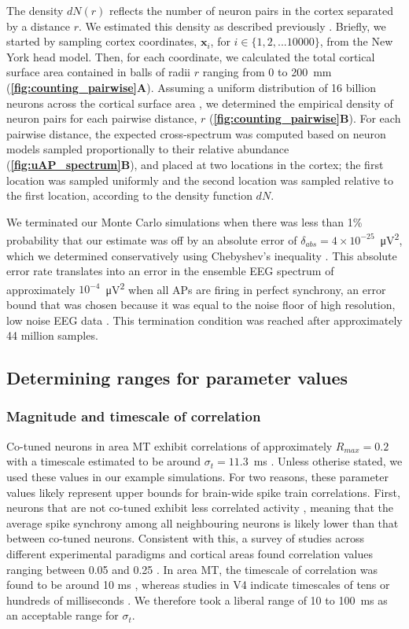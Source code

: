 The density $dN(r)$ reflects the number of neuron pairs in the cortex separated by a distance $r$. We estimated this density as described previously \cite{Brake2024}. Briefly, we started by sampling cortex coordinates, $\bm{x}_i$, for $i\in\{1,2,...10000\}$, from the New York head model. Then, for each coordinate, we calculated the total cortical surface area contained in balls of radii $r$ ranging from 0 to 200~\unit{\milli\meter}  (\textbf{\autoref{fig:counting_pairwise}A}). Assuming a uniform distribution of 16 billion neurons across the cortical surface area \cite{Azevedo2009}, we determined the empirical density of neuron pairs for each pairwise distance, $r$ (\textbf{\autoref{fig:counting_pairwise}B}). For each pairwise distance, the expected cross-spectrum was computed based on neuron models sampled proportionally to their relative abundance (\textbf{\autoref{fig:uAP_spectrum}B}), and placed at two locations in the cortex; the first location was sampled uniformly and the second location was sampled relative to the first location, according to the density function $dN$.

We terminated our Monte Carlo simulations when there was less than 1\% probability that our estimate was off by an absolute error of $\delta_{abs} = 4\times10^{-25}$~\unit{\micro\volt^2}, which we determined conservatively using Chebyshev's inequality \cite{Bicher2022, Robert2004}. This absolute error rate translates into an error in the ensemble EEG spectrum of approximately $10^{-4}$~\unit{\micro\volt^2} when all APs are firing in perfect synchrony, an error bound that was chosen because it was equal to the noise floor of high resolution, low noise EEG data \cite{Scheer2006}. This termination condition was reached after approximately 44 million samples.

\subsection{Determining ranges for parameter values}
\subsubsection{Magnitude and timescale of correlation}
Co-tuned neurons in area MT exhibit correlations of approximately $R_{max}=0.2$ with a timescale estimated to be around $\sigma_t=11.3$~\unit{\milli\second} \cite{Bair2001}. Unless otherise stated, we used these values in our example simulations. For two reasons, these parameter values likely represent upper bounds for brain-wide spike train correlations. First, neurons that are not co-tuned exhibit less correlated activity \cite{Kohn2005}, meaning that the average spike synchrony among all neighbouring neurons is likely lower than that between co-tuned neurons. Consistent with this, a survey of studies across different experimental paradigms and cortical areas found correlation values ranging between 0.05 and 0.25  \cite{Cohen2011}. In area MT, the timescale of correlation was found to be around 10 ms \cite{Bair2001}, whereas studies in V4 indicate timescales of tens or hundreds of milliseconds \cite{Mitchell2009,Smith2013}. We therefore took a liberal range of 10 to 100~\unit{\milli\second} as an acceptable range for $\sigma_t$.

